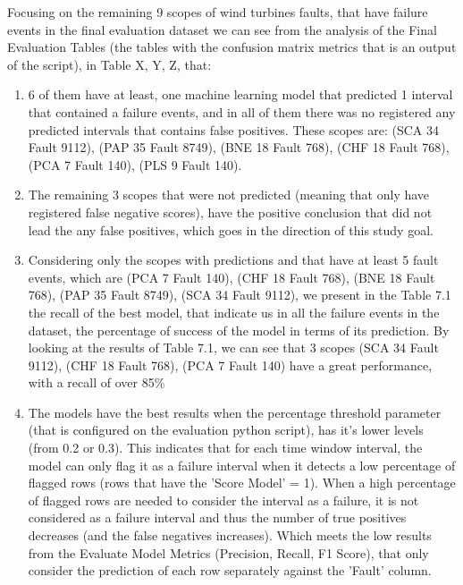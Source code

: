 Focusing on the remaining 9 scopes of wind turbines faults, that have failure events in the final evaluation dataset we can see from the analysis of the Final Evaluation Tables (the tables with the confusion matrix metrics that is an output of the script), in Table X, Y, Z, that:
\begin{enumerate}
    \item
6 of them have at least, one machine learning model that predicted 1 interval that contained a failure events, and in all of them there was no registered any predicted intervals that contains false positives.
These scopes are: (SCA 34 Fault 9112), (PAP 35 Fault 8749), (BNE 18 Fault 768), (CHF 18 Fault 768), (PCA 7 Fault 140), (PLS 9 Fault 140).
    \item
The remaining 3 scopes that were not predicted (meaning that only have registered false negative scores), have the positive conclusion that did not lead the any false positives, which goes in the direction of this study goal.
    \item
Considering only the scopes with predictions and that have at least 5 fault events, which are (PCA 7 Fault 140), (CHF 18 Fault 768), (BNE 18 Fault 768), (PAP 35 Fault 8749), (SCA 34 Fault 9112), we present in the Table 7.1 the recall of the best model, that indicate us in all the failure events in the dataset, the percentage of success of the model in terms of its prediction.
By looking at the results of Table 7.1, we can see that 3 scopes (SCA 34 Fault 9112), (CHF 18 Fault 768), (PCA 7 Fault 140) have a great performance, with a recall of over 85\%
    \item
The models have the best results when the percentage threshold parameter (that is configured on the evaluation python script), has it's lower levels (from 0.2 or 0.3). This indicates that for each time window interval, the model can only flag it as a failure interval when it detects a low percentage of flagged rows (rows that have the 'Score Model' = 1). When a high percentage of flagged rows are needed to consider the interval as a failure, it is not considered as a failure interval and thus the number of true positives decreases (and the false negatives increases). 
Which meets the low results from the Evaluate Model Metrics (Precision, Recall, F1 Score), that only consider the prediction of each row separately against the 'Fault' column.
\end{enumerate}

